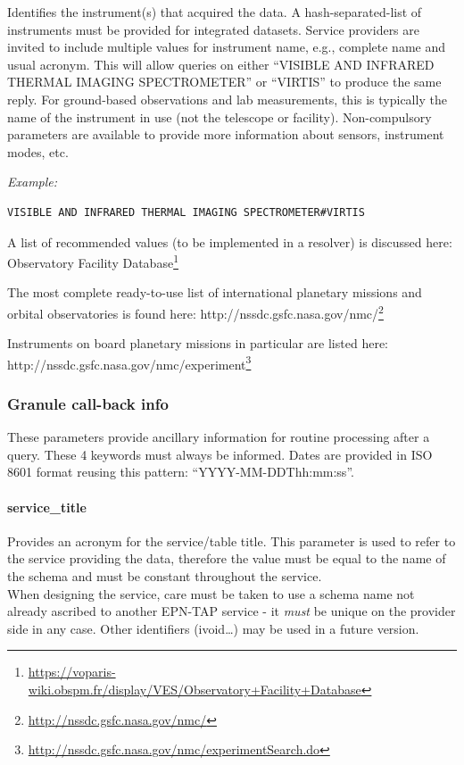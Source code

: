 \documentclass[11pt,a4paper]{ivoa}
\begin{document}
Identifies the instrument(s) that acquired the data. A hash-separated-list of instruments must be provided for integrated datasets. Service providers are invited to include multiple values for instrument name, e.g., complete name and usual acronym. This will allow queries on either ``VISIBLE AND INFRARED THERMAL IMAGING SPECTROMETER'' or ``VIRTIS'' to produce the same reply. For ground-based observations and lab measurements, this is typically the name of the instrument in use (not the telescope or facility). Non-compulsory parameters are available to provide more information about sensors, instrument modes, etc.

\emph{\emph{Example:}}

\begin{verbatim}
VISIBLE AND INFRARED THERMAL IMAGING SPECTROMETER#VIRTIS
\end{verbatim}

A list of recommended values (to be implemented in a resolver) is discussed here: Observatory Facility Database\footnote{\url{https://voparis-wiki.obspm.fr/display/VES/Observatory+Facility+Database}}

The most complete ready-to-use list of international planetary missions and orbital observatories is found here: http://nssdc.gsfc.nasa.gov/nmc/\footnote{\url{http://nssdc.gsfc.nasa.gov/nmc/}}

Instruments on board planetary missions in particular are listed here: \\http://nssdc.gsfc.nasa.gov/nmc/experiment\footnote{\url{http://nssdc.gsfc.nasa.gov/nmc/experimentSearch.do}}

\subsubsection{Granule call-back info}

These parameters provide ancillary information for routine processing after a query. These 4 keywords must always be informed. Dates are provided in ISO 8601 format reusing this pattern: “YYYY-MM-DDThh:mm:ss”. 

\paragraph{service\_title}

Provides an acronym for the service/table title. This parameter is used to refer to the service providing the data, therefore the value must be equal to the name of the schema and must be constant throughout the service.\\When designing the service, care must be taken to use a schema name not already ascribed to another EPN-TAP service - it \emph{must} be unique on the provider side in any case. Other identifiers (ivoid…) may be used in a future version.
\end{document}
